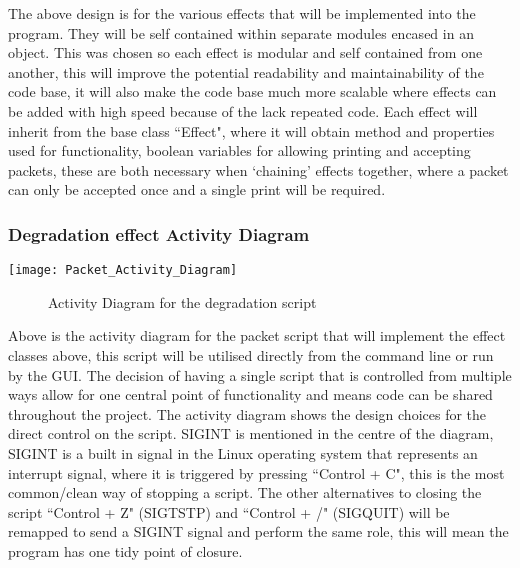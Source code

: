 The above design is for the various effects that will be implemented into the program. They will be self contained within separate modules encased in an object. This was chosen so each effect is modular and self contained from one another, this will improve the potential readability and maintainability of the code base, it will also make the code base much more scalable where effects can be added with high speed because of the lack repeated code.  Each effect will inherit from the base class ``Effect", where it will obtain method and properties used for functionality, boolean variables for allowing printing and accepting packets, these are both necessary when `chaining' effects together, where a packet can only be accepted once and a single print will be required.


\subsubsection{Degradation effect Activity Diagram}

\begin{center}
	\texttt{[image: Packet\_Activity\_Diagram]}
	\begin{figure}[h]
		\caption{Activity Diagram for the degradation script}
	\end{figure}
\end{center}

Above is the activity diagram for the packet script that will implement the effect classes above, this script will be utilised directly from the command line or run by the GUI. The decision of having a single script that is controlled from multiple ways allow for one central point of functionality and means code can be shared throughout the project. The activity diagram shows the design choices for the direct control on the script. SIGINT is mentioned in the centre of the diagram, SIGINT is a built in signal in the Linux operating system that represents an interrupt signal, where it is triggered by pressing ``Control + C", this is the most common/clean way of stopping a script. The other alternatives to closing the script ``Control + Z" (SIGTSTP) and ``Control + /" (SIGQUIT) will be remapped to send a SIGINT signal and perform the same role, this will mean the program has one tidy point of closure.

